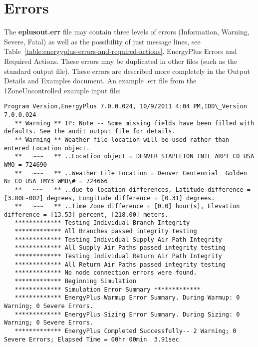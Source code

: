 \section{Errors}\label{errors}

The \textbf{eplusout.err} file may contain three levels of errors (Information, Warning, Severe, Fatal) as well as the possibility of just message lines, see Table~\ref{table:energyplus-errors-and-required-actions}. EnergyPlus Errors and Required Actions. These errors may be duplicated in other files (such as the standard output file). These errors are described more completely in the Output Details and Examples document. An example .err file from the 1ZoneUncontrolled example input file:

\begin{lstlisting}
Program Version,EnergyPlus 7.0.0.024, 10/9/2011 4:04 PM,IDD\_Version 7.0.0.024
   ** Warning ** IP: Note -- Some missing fields have been filled with defaults. See the audit output file for details.
   ** Warning ** Weather file location will be used rather than entered Location object.
   **   ~~~   ** ..Location object = DENVER STAPLETON INTL ARPT CO USA WMO = 724690
   **   ~~~   ** ..Weather File Location = Denver Centennial  Golden   Nr CO USA TMY3 WMO\# = 724666
   **   ~~~   ** ..due to location differences, Latitude difference = [3.00E-002] degrees, Longitude difference = [0.31] degrees.
   **   ~~~   ** ..Time Zone difference = [0.0] hour(s), Elevation difference = [13.53] percent, [218.00] meters.
   ************* Testing Individual Branch Integrity
   ************* All Branches passed integrity testing
   ************* Testing Individual Supply Air Path Integrity
   ************* All Supply Air Paths passed integrity testing
   ************* Testing Individual Return Air Path Integrity
   ************* All Return Air Paths passed integrity testing
   ************* No node connection errors were found.
   ************* Beginning Simulation
   ************* Simulation Error Summary *************
   ************* EnergyPlus Warmup Error Summary. During Warmup: 0 Warning; 0 Severe Errors.
   ************* EnergyPlus Sizing Error Summary. During Sizing: 0 Warning; 0 Severe Errors.
   ************* EnergyPlus Completed Successfully-- 2 Warning; 0 Severe Errors; Elapsed Time = 00hr 00min  3.91sec
\end{lstlisting}

